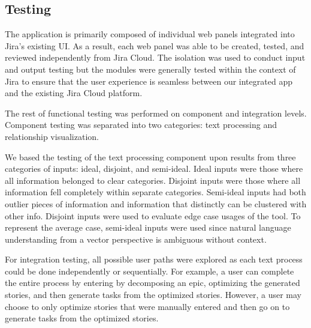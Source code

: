 \subsection{Testing}

The application is primarily composed of individual web panels integrated into Jira’s existing UI. As a result, each web panel was able to be created, tested, and reviewed independently from Jira Cloud. The isolation was used to conduct input and output testing but the modules were generally tested within the context of Jira to ensure that the user experience is seamless between our integrated app and the existing Jira Cloud platform.

The rest of functional testing was performed on component and integration levels. Component testing was separated into two categories: text processing and relationship visualization.

We based the testing of the text processing component upon results from three categories of inputs: ideal, disjoint, and semi-ideal. Ideal inputs were those where all information belonged to clear categories. Disjoint inputs were those where all information fell completely within separate categories. Semi-ideal inputs had both outlier pieces of information and information that distinctly can be clustered with other info. Disjoint inputs were used to evaluate edge case usages of the tool. To represent the average case, semi-ideal inputs were used since natural language understanding from a vector perspective is ambiguous without context.

For integration testing, all possible user paths were explored as each text process could be done independently or sequentially. For example, a user can complete the entire process by entering by decomposing an epic, optimizing the generated stories, and then generate tasks from the optimized stories. However, a user may choose to only optimize stories that were manually entered and then go on to generate tasks from the optimized stories. 
